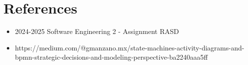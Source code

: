 \section{References}
\begin{itemize}
    \item 2024-2025 Software Engineering 2 - Assignment RASD
    \item https://medium.com/@gmanzano.mx/state-machines-activity-diagrams-and-bpmn-strategic-decisions-and-modeling-perspective-ba2240aaa5ff
\end{itemize}
